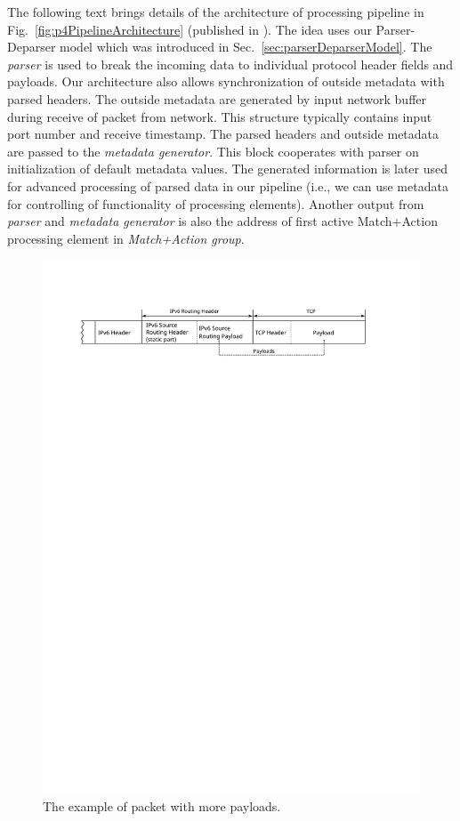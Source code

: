 The following text brings details of the architecture of processing pipeline in Fig.~\ref{fig:p4PipelineArchitecture} 
(published in \cite{2016h2rc-p4}). 
The idea uses our Parser-Deparser model which was introduced in Sec.~\ref{sec:parserDeparserModel}. 
The \emph{parser} is used to break the incoming data to individual protocol header fields and payloads.
Our architecture also allows synchronization of outside metadata with parsed headers. 
The outside metadata are generated by input network buffer during receive of packet from network. 
This structure typically contains input port number and receive timestamp. The parsed headers and outside metadata are passed to the
\emph{metadata generator}. This block cooperates with parser on initialization of default metadata values.
The generated information is later used for advanced processing of parsed data in our pipeline 
(i.e., we can use metadata for controlling of functionality of processing elements).
Another output from \emph{parser} and \emph{metadata generator} is also the address of first active Match+Action processing 
element in \emph{Match+Action group}.

\begin{figure}[b]
    \centering
    \includegraphics[scale=0.9]{chapters/pic/IPv6MorePayloads}
    \caption{The example of packet with more payloads.}
    \label{fig:IPv6MorePayloads}
\end{figure}

